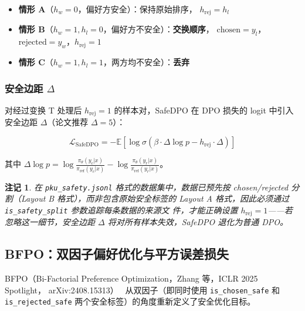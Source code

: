 \documentclass[12pt,a4paper,UTF8]{ctexart}
\newcommand{\E}{\mathbb{E}}
\newcommand{\sigmoid}{\sigma}
\newcommand{\piref}{\pi_{\mathrm{ref}}}
\newcommand{\pitheta}{\pi_{\theta}}
\newtheorem{remark}{注记}
\begin{document}
\begin{tcolorbox}[colback=gray!8, colframe=black!55, title=变换 T 规则, fonttitle=\bfseries]
\begin{itemize}
  \item \textbf{情形 A}（$h_w=0$，偏好方安全）：保持原始排序，
    $h_{\mathrm{rej}} = h_l$
  \item \textbf{情形 B}（$h_w=1, h_l=0$，偏好方不安全）：\textbf{交换顺序}，
    $\mathrm{chosen}=y_l$，$\mathrm{rejected}=y_w$，$h_{\mathrm{rej}}=1$
  \item \textbf{情形 C}（$h_w=1, h_l=1$，两方均不安全）：\textbf{丢弃}
\end{itemize}
\end{tcolorbox}

\subsubsection{安全边距 $\Delta$}

对经过变换 T 处理后 $h_{\mathrm{rej}}=1$ 的样本对，SafeDPO 在 DPO 损失的
logit 中引入安全边距 $\Delta$（论文推荐 $\Delta=5$）：

\begin{equation}
  \mathcal{L}_{\mathrm{SafeDPO}}
    = -\E\!\left[
        \log\sigmoid\!\left(
          \beta\cdot\Delta\log p - h_{\mathrm{rej}}\cdot\Delta
        \right)
      \right]
  \label{eq:safedpo}
\end{equation}

其中 $\Delta\log p = \log\frac{\pitheta(y_c|x)}{\piref(y_c|x)} -
\log\frac{\pitheta(y_r|x)}{\piref(y_r|x)}$。

\begin{remark}
在 \texttt{pku\_safety.jsonl} 格式的数据集中，数据已预先按
chosen/rejected 分割（Layout B 格式），而非包含原始安全标签的 Layout A
格式，因此必须通过 \texttt{is\_safety\_split} 参数追踪每条数据的来源文
件，才能正确设置 $h_{\mathrm{rej}}=1$——若忽略这一细节，安全边距 $\Delta$
将对所有样本失效，SafeDPO 退化为普通 DPO。
\end{remark}

\subsection{BFPO：双因子偏好优化与平方误差损失}

BFPO（Bi-Factorial Preference Optimization，Zhang 等，ICLR 2025 Spotlight，
arXiv:2408.15313）~\cite{bfpo2025} 从双因子（即同时使用 \texttt{is\_chosen\_safe}
和 \texttt{is\_rejected\_safe} 两个安全标签）的角度重新定义了安全优化目标。
\end{document}
